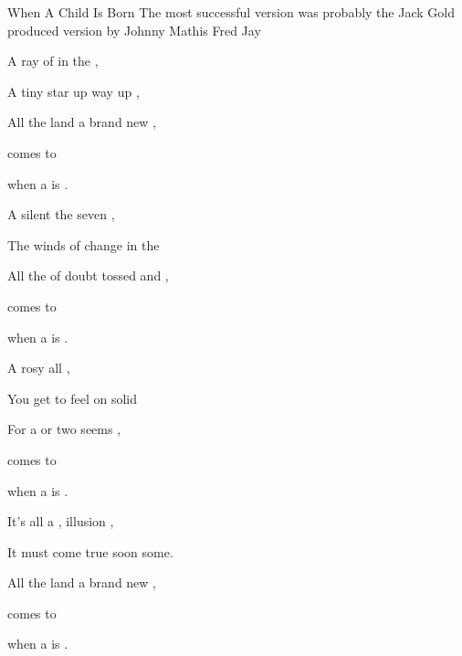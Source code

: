 \begin{SBSong}{When A Child Is Born}
    {The most successful version was probably the Jack Gold produced version by Johnny Mathis}
    {Fred Jay}
  \begin{SBVerse}
	A ray of   in the ,  
	
	A tiny star  up way up ,   
	
	All  the land  a brand new ,
	
	  comes to  

	when a  is .   
  \end{SBVerse}
  \begin{SBVerse}
	A silent   the seven ,  
	
	The winds of change  in the   
	
	All the  of doubt  tossed and ,
	
	  comes to  

	when a  is .   
  \end{SBVerse}
  \begin{SBVerse}
	A rosy   all ,  
	
	You get to feel  on solid    
	
	For a  or two  seems ,
	
	  comes to  

	when a  is .   
  \end{SBVerse}
  \begin{SBVerse}
	It's all a ,  illusion ,  
	
	It must come true  soon some.   
	
	All  the land  a brand new ,
	
	  comes to  

	when a  is .  
  \end{SBVerse}
\end{SBSong}

